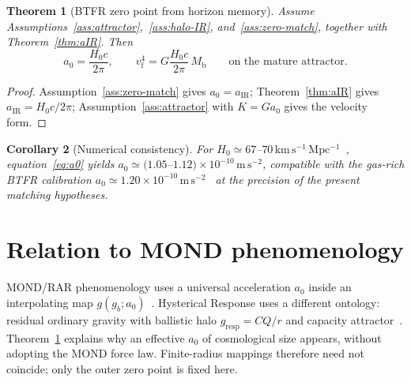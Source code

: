 \documentclass[11pt]{article}
\newtheorem{theorem}{Theorem}[section]
\newtheorem{corollary}[theorem]{Corollary}
\theoremstyle{definition}
\theoremstyle{remark}
\newcommand{\Mb}{M_{\mathrm{b}}}
\newcommand{\vf}{v_{\mathrm{f}}}
\begin{document}
\begin{theorem}[BTFR zero point from horizon memory]
\label{thm:a0}
Assume Assumptions~\ref{ass:attractor},~\ref{ass:halo-IR}, and~\ref{ass:zero-match}, together
with Theorem~\ref{thm:aIR}.
Then
\begin{equation}
\label{eq:a0}
\boxed{a_0=\frac{H_0c}{2\pi},}
\qquad
\vf^{4}=G\frac{H_0c}{2\pi}\,\Mb
\qquad\text{on the mature attractor.}
\end{equation}
\end{theorem}

\begin{proof}
Assumption~\ref{ass:zero-match} gives $a_0=a_{\mathrm{IR}}$; Theorem~\ref{thm:aIR} gives
$a_{\mathrm{IR}}=H_0c/2\pi$; Assumption~\ref{ass:attractor} with $K=Ga_0$ gives the velocity form.
\end{proof}

\begin{corollary}[Numerical consistency]
\label{cor:numeric}
For $H_0\simeq67$--$70\,\mathrm{km\,s^{-1}\,Mpc^{-1}}$~\cite{Planck2018},
equation~\eqref{eq:a0} yields $a_0\simeq(1.05$--$1.12)\times10^{-10}\,\mathrm{m\,s^{-2}}$,
compatible with the gas-rich BTFR calibration
$a_0\simeq1.20\times10^{-10}\,\mathrm{m\,s^{-2}}$~\cite{mcgaugh2012,lelli2016} at the
precision of the present matching hypotheses.
\end{corollary}

\section{Relation to MOND phenomenology}
\label{sec:mond}
MOND/RAR phenomenology uses a universal acceleration $a_0$ inside an interpolating map
$g(g_b;a_0)$~\cite{McGaugh2016}.
Hysterical Response uses a different ontology: residual ordinary gravity with ballistic
halo $g_{\mathrm{resp}}=CQ/r$ and capacity attractor~\cite{boyd2026galactic}.
Theorem~\ref{thm:a0} explains why an effective $a_0$ of cosmological size appears, without
adopting the MOND force law.
Finite-radius mappings therefore need not coincide; only the outer zero point is fixed here.
\end{document}
